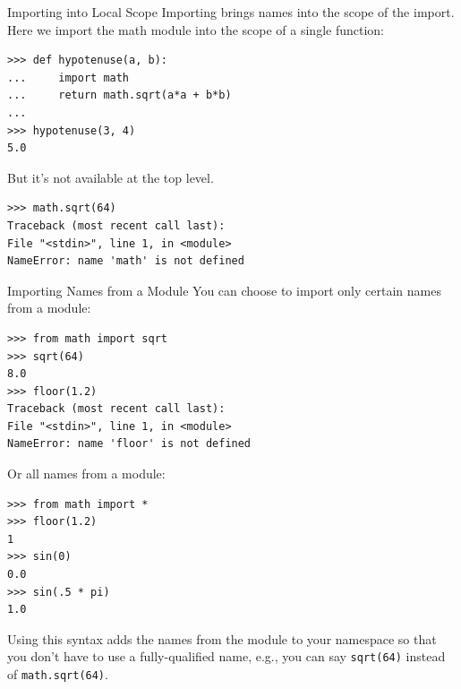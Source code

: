 \documentclass[smaller, aspectratio=1610]{beamer}
\begin{document}
\begin{frame}[label={sec:orgf9faa8c},fragile]{Importing into Local Scope}
 Importing brings names into the scope of the import.  Here we import the math module into the scope of a single function:

\lstset{language=Python,label= ,caption= ,captionpos=b,numbers=none}
\begin{lstlisting}
>>> def hypotenuse(a, b):
...     import math
...     return math.sqrt(a*a + b*b)
...
>>> hypotenuse(3, 4)
5.0
\end{lstlisting}

But it's not available at the top level.

\lstset{language=Python,label= ,caption= ,captionpos=b,numbers=none}
\begin{lstlisting}
>>> math.sqrt(64)
Traceback (most recent call last):
File "<stdin>", line 1, in <module>
NameError: name 'math' is not defined
\end{lstlisting}
\end{frame}

\begin{frame}[label={sec:org1c2155a},fragile]{Importing Names from a Module}
 You can choose to import only certain names from a module:

\lstset{language=Python,label= ,caption= ,captionpos=b,numbers=none}
\begin{lstlisting}
>>> from math import sqrt
>>> sqrt(64)
8.0
>>> floor(1.2)
Traceback (most recent call last):
File "<stdin>", line 1, in <module>
NameError: name 'floor' is not defined
\end{lstlisting}

Or all names from a module:

\lstset{language=Python,label= ,caption= ,captionpos=b,numbers=none}
\begin{lstlisting}
>>> from math import *
>>> floor(1.2)
1
>>> sin(0)
0.0
>>> sin(.5 * pi)
1.0
\end{lstlisting}

Using this syntax adds the names from the module to your namespace so that you don't have to use a fully-qualified name, e.g., you can say \texttt{sqrt(64)} instead of \texttt{math.sqrt(64)}.
\end{frame}
\end{document}
